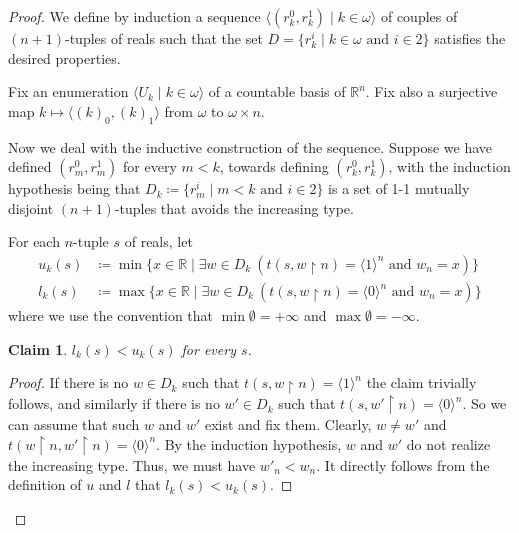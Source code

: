 \documentclass[12pt]{amsart}
\newtheorem{claim}{Claim}[theorem]
\theoremstyle{definition}
\theoremstyle{remark}
\begin{document}
\begin{proof}
We define by induction a sequence $\langle (r_k^0, r_k^1) \mid k \in\omega\rangle$ of couples of $(n+1)$-tuples of reals such that the set $D = \{r_k^i \mid k\in\omega \text{ and } i \in 2\}$ satisfies the desired properties.

Fix an enumeration $\langle U_k \mid k\in\omega\rangle$ of a countable basis of $\mathbb{R}^n$. Fix also a surjective map $k \mapsto \langle (k)_0, (k)_1\rangle$ from $\omega$ to $\omega\times n$.

Now we deal with the inductive construction of the sequence. Suppose we have defined $(r_m^0, r_m^1)$ for every $m < k$, towards defining $(r_k^0, r_k^1)$, with the induction hypothesis being that $D_k \coloneqq \{r_m^i \mid m < k \text{ and } i \in 2\}$ is a set of 1-1 mutually disjoint $(n+1)$-tuples that avoids the increasing type. 

For each $n$-tuple $s$ of reals, let
\begin{align*}
u_k(s) &\coloneqq \min \{x \in \mathbb{R} \mid \exists w \in D_k \ (t(s, w \upharpoonright n) = \langle 1 \rangle^n \text{ and } w_n = x)\}\\
l_k(s) &\coloneqq \max \{x \in \mathbb{R} \mid \exists w \in D_k \ (t(s, w \upharpoonright n) = \langle 0 \rangle^n \text{ and } w_n = x)\}
\end{align*}
where we use the convention that $\min \emptyset = +\infty$ and $\max \emptyset = -\infty$.
\begin{claim}\label{claim:lemma:1}
$l_k(s) < u_k(s)$ for every $s$.
\end{claim}
\begin{proof}
If there is no $w \in D_k$ such that $t(s, w \upharpoonright n) = \langle 1\rangle^n$ the claim trivially follows, and similarly if there is no $w' \in D_k$ such that $t(s, w' \upharpoonright n) = \langle 0\rangle^n$. So we can assume that such $w$ and $w'$ exist and fix them. Clearly, $w \neq w'$ and $t(w \upharpoonright n, w' \upharpoonright n) = \langle 0\rangle^n$. By the induction hypothesis, $w$ and $w'$ do not realize the increasing type. Thus, we must have $w'_n < w_n$. It directly follows from the definition of $u$ and $l$ that $l_k(s) < u_k(s)$.
\end{proof}


\end{proof}
\end{document}
